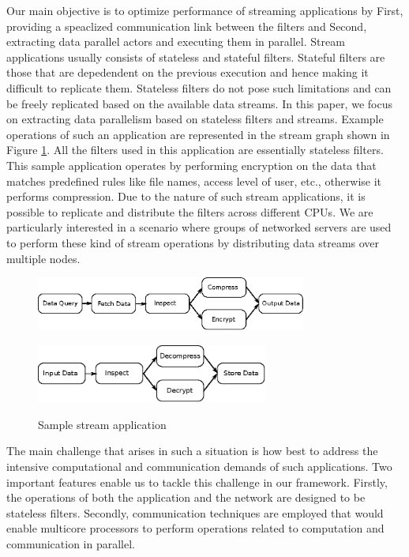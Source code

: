 \documentclass[10pt, conference, compsocconf, reqno]{IEEEtran}
\begin{document}
Our main objective is to optimize performance of streaming applications by First, providing a speaclized communication link between the filters and Second, extracting data parallel actors and executing them in parallel. Stream applications usually consists of stateless and stateful filters. Stateful filters are those that are depedendent on the previous execution and hence making it difficult to replicate them. Stateless filters do not pose such limitations and can be freely replicated based on the available data streams. In this paper, we focus on extracting data parallelism based on stateless filters and streams. Example operations of such an application are represented in the stream graph shown in Figure \ref{fig1}. All the filters used in this application are essentially stateless filters. This sample application operates by performing encryption on the data that matches predefined rules like file names, access level of user, etc., otherwise it performs compression. Due to the nature of such stream applications, it is possible to replicate and distribute the filters across different CPUs. We are particularly interested in a scenario where groups of networked servers are used to perform these kind of stream operations by distributing data streams over multiple nodes.

\begin{figure}[ht]
\centering
\subfigure
{
	\includegraphics[width=3.5in]{ip-data-proc}
}

\subfigure
{
	\includegraphics[width=3in]{op-data-proc}
}
\caption{Sample stream application}
\label{fig1}
\end{figure}

The main challenge that arises in such a situation is how best to address the intensive computational and communication demands of such applications. Two important features enable us to tackle this challenge in our framework. Firstly, the operations of both the application and the network are designed to be stateless filters. Secondly, communication techniques are employed that would enable multicore processors to perform operations related to computation and communication in parallel.
\end{document}
